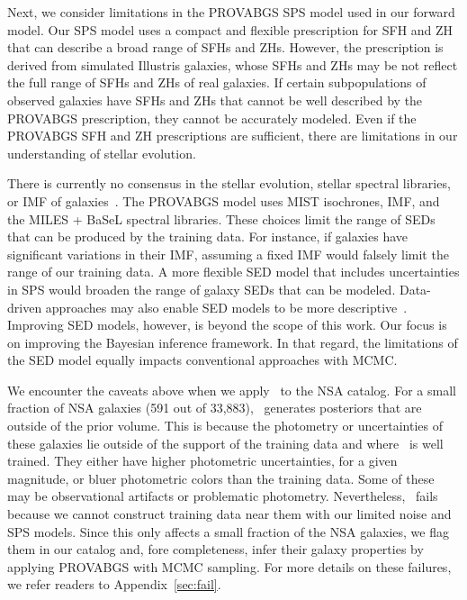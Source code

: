 Next, we consider limitations in the PROVABGS SPS model used in our forward
model. 
Our SPS model uses a compact and flexible prescription for SFH and ZH that can
describe a broad range of SFHs and ZHs.
However, the prescription is derived from simulated Illustris galaxies, whose
SFHs and ZHs may be not reflect the full range of SFHs and ZHs of real
galaxies.
If certain subpopulations of observed galaxies have SFHs and ZHs that cannot be
well described by the PROVABGS prescription, they cannot be accurately modeled.
Even if the PROVABGS SFH and ZH prescriptions are sufficient, there are
limitations in our understanding of stellar evolution. 

There is currently no consensus in the stellar evolution, stellar spectral
libraries, or IMF of galaxies~\citep[\emph{e.g.}][]{treu2010, vandokkum2010,
rosani2018, ge2019, sonnenfeld2019}.
The PROVABGS model uses MIST isochrones, \cite{chabrier2003} IMF, and the MILES
+ BaSeL spectral libraries. 
These choices limit the range of SEDs that can be produced by the training
data. 
For instance, if galaxies have significant variations in their IMF, assuming a
fixed IMF would falsely limit the range of our training data.  
A more flexible SED model that includes uncertainties in SPS would broaden the
range of galaxy SEDs that can be modeled.
Data-driven approaches may also enable SED models to be more
descriptive~\citep[\emph{e.g.}][]{hogg2016, portillo2020}. 
Improving  SED models, however, is beyond the scope of this work. 
Our focus is on improving the Bayesian inference framework.
In that regard, the limitations of the SED model equally impacts conventional
approaches with MCMC. 

We encounter the caveats above when we apply \sedflow~to the NSA catalog. 
For a small fraction of NSA galaxies (591 out of 33,883), \sedflow~generates
posteriors that are outside of the prior volume. 
This is because the photometry or uncertainties of these galaxies lie outside
of the support of the training data and where \sedflow~is well trained. 
They either have higher photometric uncertainties, for a given magnitude, or
bluer photometric colors than the training data. 
Some of these may be observational artifacts or problematic photometry.
Nevertheless, \sedflow~fails because we cannot construct training data near
them with our limited noise and SPS models. 
Since this only affects a small fraction of the NSA galaxies, we flag them in
our catalog and, fore completeness, infer their galaxy properties by applying
PROVABGS with MCMC sampling.
For more details on these failures, we refer readers to
Appendix~\ref{sec:fail}.

